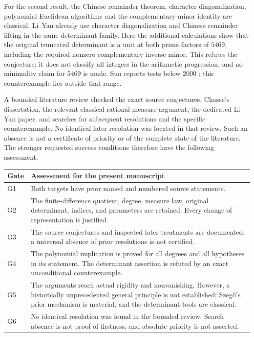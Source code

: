 \documentclass[11pt,a4paper]{article}
\theoremstyle{remark}
\begin{document}
For the second result, the Chinese remainder theorem, character
diagonalization, polynomial Euclidean algorithms and the
complementary-minor identity are classical. Li--Yan already use
character diagonalization and Chinese remainder lifting in the same
determinant family. Here the additional calculations show that the
original truncated determinant is a unit at both prime factors of
$5469$, including the required nonzero complementary inverse minor.
This refutes the conjecture; it does not classify all integers in the
arithmetic progression, and no minimality claim for $5469$ is made.
Sun reports tests below $2000$ \cite[Remark~5.6]{Sun2024}; this
counterexample lies outside that range.

A bounded literature review checked the exact source conjectures,
Chasse's dissertation, the relevant classical rational-measure
argument, the dedicated Li--Yan paper, and searches for subsequent
resolutions and the specific counterexample. No identical later
resolution was located in that review. Such an absence is not a
certificate of priority or of the complete state of the literature.
The stronger requested success conditions therefore have the
following assessment.

\begin{center}\small
\begin{tabular}{@{}p{}p{}@{}}
\toprule
Gate & Assessment for the present manuscript\\
\midrule
G1 & Both targets have prior named and numbered source statements.\\
G2 & The finite-difference quotient, degree, measure law, original determinant, indices, and parameters are retained. Every change of representation is justified.\\
G3 & The source conjectures and inspected later treatments are documented; a universal absence of prior resolutions is not certified.\\
G4 & The polynomial implication is proved for all degrees and all hypotheses in its statement. The determinant assertion is refuted by an exact unconditional counterexample.\\
G5 & The arguments reach actual rigidity and nonvanishing. However, a historically unprecedented general principle is not established; Szeg\H{o}'s prior mechanism is material, and the determinant tools are classical.\\
G6 & No identical resolution was found in the bounded review. Search absence is not proof of firstness, and absolute priority is not asserted.\\
\bottomrule
\end{tabular}
\end{center}
\end{document}
